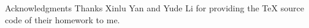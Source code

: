 \documentclass[8pt]{beamer}
\begin{document}
\begin{frame}[t]{Acknowledgments}
  Thanks Xinlu Yan and Yude Li for providing the \TeX{} source code of their homework to me.
\end{frame}



  




    
    

 
    

\end{document}
